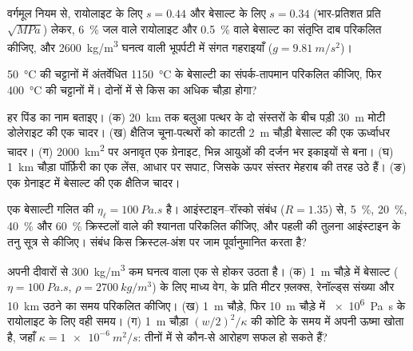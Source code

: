 \begin{exercise}[$\star$]\label{exo:b2:magma-emplacement:2}
वर्गमूल नियम से, रायोलाइट के लिए $s = 0.44$ और बेसाल्ट के लिए $s = 0.34$
(भार-प्रतिशत प्रति $\sqrt{\unit{MPa}}$) लेकर, \qty{6}{\percent} जल वाले
रायोलाइट और \qty{0.5}{\percent} वाले बेसाल्ट का संतृप्ति दाब परिकलित कीजिए,
और \qty{2600}{kg/m^3} घनत्व वाली भूपर्पटी में संगत गहराइयाँ
($g = \qty{9.81}{m/s^2}$)।
\end{exercise}

\begin{exercise}[$\star$]\label{exo:b2:magma-emplacement:3}
\qty{50}{\celsius} की चट्टानों में अंतर्वेधित \qty{1150}{\celsius} के बेसाल्टी  का संपर्क-तापमान
परिकलित कीजिए, फिर \qty{400}{\celsius} की चट्टानों में।
दोनों में से किस  का  अधिक चौड़ा होगा?
\end{exercise}

\begin{exercise}[$\star$]\label{exo:b2:magma-emplacement:4}
हर पिंड का नाम बताइए। (क) \qty{20}{km} तक बलुआ पत्थर के दो संस्तरों के बीच पड़ी
\qty{30}{m} मोटी डोलेराइट की एक चादर। (ख) क्षैतिज चूना-पत्थरों को काटती
\qty{2}{m} चौड़ी बेसाल्ट की एक ऊर्ध्वाधर चादर। (ग) \qty{2000}{km^2} पर अनावृत एक ग्रेनाइट,
भिन्न आयुओं की दर्जन भर इकाइयों से बना। (घ) \qty{1}{km} चौड़ा पॉर्फ़िरी का एक लेंस,
आधार पर सपाट, जिसके ऊपर संस्तर मेहराब की तरह उठे हैं। (ङ) एक ग्रेनाइट में
बेसाल्ट की एक क्षैतिज चादर।
\end{exercise}

\begin{exercise}[$\star\star$]\label{exo:b2:magma-emplacement:5}
एक बेसाल्टी गलित की $\eta_{\ell} = \qty{100}{Pa.s}$ है। आइंस्टाइन--रॉस्को
संबंध ($R = 1.35$) से, \qty{5}{\percent},
\qty{20}{\percent}, \qty{40}{\percent} और \qty{60}{\percent}
क्रिस्टलों वाले  की श्यानता परिकलित कीजिए, और पहली की तुलना आइंस्टाइन के तनु सूत्र से कीजिए।
संबंध किस क्रिस्टल-अंश पर जाम पूर्वानुमानित करता है?
\end{exercise}

\begin{exercise}[$\star\star$]\label{exo:b2:magma-emplacement:6}
अपनी दीवारों से \qty{300}{kg/m^3} कम घनत्व वाला  एक  से होकर उठता है।
(क) \qty{1}{m} चौड़े  में बेसाल्ट ($\eta = \qty{100}{Pa.s}$, $\rho = \qty{2700}{kg/m^3}$) के लिए
माध्य वेग,  के प्रति मीटर फ़्लक्स,
रेनॉल्ड्स संख्या और \qty{10}{km} उठने का समय परिकलित कीजिए। (ख) \qty{1}{m} चौड़े, फिर \qty{10}{m} चौड़े  में
\qty{e6}{Pa.s} के रायोलाइट के लिए वही समय। (ग) \qty{1}{m} चौड़ा
 $(w/2)^2/\kappa$ की कोटि के समय में अपनी ऊष्मा खोता है, जहाँ $\kappa =
\qty{1e-6}{m^2/s}$: तीनों में से कौन-से आरोहण सफल हो सकते हैं?
\end{exercise}

